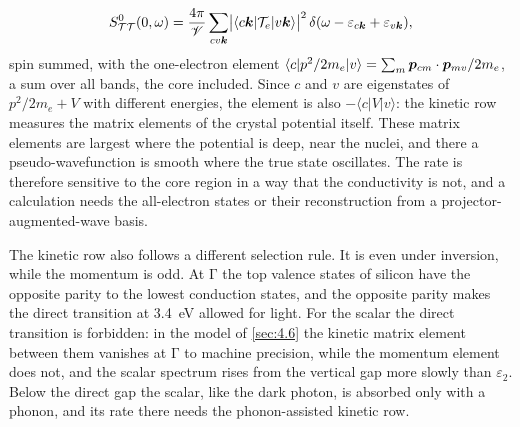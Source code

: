 \begin{equation}
  S^0_{\mathcal{T}\mathcal{T}}(0,\omega) = \frac{4\pi}{\mathscr{V}}\sum_{cv\bm{k}}\bigl|\langle c\bm{k}|\mathcal{T}_e|v\bm{k}\rangle\bigr|^2\,\delta(\omega - \varepsilon_{c\bm{k}} + \varepsilon_{v\bm{k}}) ,
  \label{eq:10.7-S0}
\end{equation}
spin summed, with the one-electron element $\langle c|p^2/2m_e|v\rangle = \sum_m\bm{p}_{cm}\cdot\bm{p}_{mv}/2m_e$, a sum over all bands, the core included. Since $c$ and $v$ are eigenstates of $p^2/2m_e + V$ with different energies, the element is also $-\langle c|V|v\rangle$: the kinetic row measures the matrix elements of the crystal potential itself. These matrix elements are largest where the potential is deep, near the nuclei, and there a pseudo-wavefunction is smooth where the true state oscillates. The rate is therefore sensitive to the core region in a way that the conductivity is not, and a calculation needs the all-electron states or their reconstruction from a projector-augmented-wave basis.

The kinetic row also follows a different selection rule. It is even under inversion, while the momentum is odd. At $\mathrm{\Gamma}$ the top valence states of silicon have the opposite parity to the lowest conduction states, and the opposite parity makes the direct transition at \SI{3.4}{eV} allowed for light. For the scalar the direct transition is forbidden: in the model of \cref{sec:4.6} the kinetic matrix element between them vanishes at $\mathrm{\Gamma}$ to machine precision, while the momentum element does not, and the scalar spectrum rises from the vertical gap more slowly than $\varepsilon_2$. Below the direct gap the scalar, like the dark photon, is absorbed only with a phonon, and its rate there needs the phonon-assisted kinetic row.

